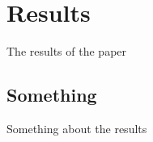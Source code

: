 \section{Results}
\label{sec:results}

The results of the paper

\subsection{Something}

Something about the results
